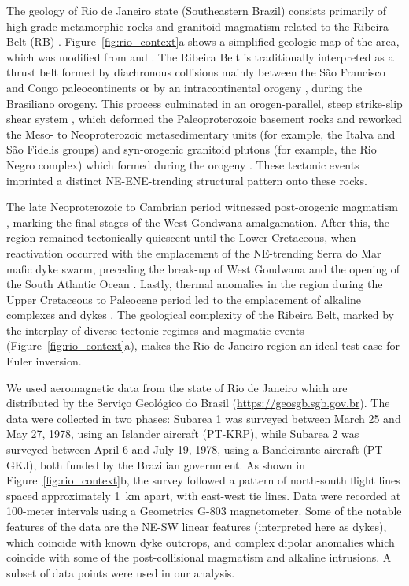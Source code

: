 The geology of Rio de Janeiro state (Southeastern Brazil) consists primarily of
high-grade metamorphic rocks and granitoid magmatism related to the Ribeira
Belt (RB) \citep{Heilbron2020}.
Figure~\ref{fig:rio_context}a shows a simplified geologic map of the area,
which was modified from \citet{Heilbron2016} and \citet{Dantas2017}.
The Ribeira Belt is traditionally interpreted as a thrust
belt formed by diachronous collisions mainly between the São Francisco and
Congo paleocontinents \citep{Heilbron2008, Trouw2000} or by an intracontinental
orogeny \citep[\textit{e.g.}][]{Meira2015, Meira2019}, during the Brasiliano
orogeny. This process culminated in an orogen-parallel, steep strike-slip shear
system \citep{EgydioSilva2005}, which deformed the Paleoproterozoic basement
rocks and reworked the Meso- to Neoproterozoic metasedimentary units (for
example, the Italva and São Fidelis groups) and syn-orogenic granitoid plutons
(for example, the Rio Negro complex) which formed during the orogeny
\citep{Heilbron2003, Heilbron2020}.
These tectonic events imprinted a distinct NE-ENE-trending structural pattern
onto these rocks.

The late Neoproterozoic to Cambrian period witnessed post-orogenic magmatism
\citep[\textit{e.g.,}][]{Valeriano2011}, marking the final stages of the West
Gondwana amalgamation. After this, the region remained tectonically quiescent
until the Lower Cretaceous, when reactivation occurred with the emplacement of
the NE-trending Serra do Mar mafic dyke swarm, preceding the break-up of West
Gondwana and the opening of the South Atlantic Ocean \citep{Almeida2013}.
Lastly, thermal anomalies in the region during the Upper Cretaceous to
Paleocene period led to the emplacement of alkaline complexes and dykes
\citep{Thompson1998}.
The geological complexity of the Ribeira Belt, marked by the interplay of
diverse tectonic regimes and magmatic events (Figure~\ref{fig:rio_context}a),
makes the Rio de Janeiro region an ideal test case for Euler inversion.

We used aeromagnetic data from the state of Rio de Janeiro which are
distributed by the Serviço Geológico do Brasil
(\url{https://geosgb.sgb.gov.br}). The data were collected in two phases:
Subarea 1 was surveyed between March 25 and May 27, 1978, using an Islander
aircraft (PT-KRP), while Subarea 2 was surveyed between April 6 and
July 19, 1978, using a Bandeirante aircraft (PT-GKJ), both funded by the
Brazilian government. As shown in Figure~\ref{fig:rio_context}b, the survey
followed a pattern of north-south flight lines spaced approximately
\qty{1}{\km} apart, with east-west tie lines.
Data were recorded at 100-meter intervals using a Geometrics G-803
magnetometer. Some of the notable features of the data are the NE-SW linear
features (interpreted here as dykes), which coincide with known dyke outcrops,
and complex dipolar anomalies which coincide with some of the post-collisional
magmatism and alkaline intrusions. A subset of \RioNData{} data points were
used in our analysis.

